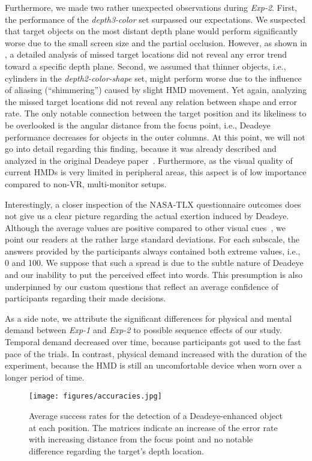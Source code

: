 \documentclass[journal]{vgtc}                %
\begin{document}
Furthermore, we made two rather unexpected observations during \textit{Exp-2}. First, the performance of the \textit{depth3-color} set surpassed our expectations. We suspected that target objects on the most distant depth plane would perform significantly worse due to the small screen size and the partial occlusion. However, as shown in , a detailed analysis of missed target locations did not reveal any error trend toward a specific depth plane. Second, we assumed that thinner objects, i.e., cylinders in the \textit{depth2-color-shape} set, might perform worse due to the influence of aliasing (``shimmering'') caused by slight HMD movement. Yet again, analyzing the missed target locations did not reveal any relation between shape and error rate. The only notable connection between the target position and its likeliness to be overlooked is the angular distance from the focus point, i.e., Deadeye performance decreases for objects in the outer columns. At this point, we will not go into detail regarding this finding, because it was already described and analyzed in the original Deadeye paper~\cite{krekhov2019deadeye}. Furthermore, as the visual quality of current HMDs is very limited in peripheral areas, this aspect is of low importance compared to non-VR, multi-monitor setups. 

Interestingly, a closer inspection of the NASA-TLX questionnaire outcomes does not give us a clear picture regarding the actual exertion induced by Deadeye. Although the average values are positive compared to other visual cues~\cite{Gutwin:2017:PPI:3025453.3025984}, we point our readers at the rather large standard deviations. For each subscale, the answers provided by the participants always contained both extreme values, i.e., 0 and 100. We suppose that such a spread is due to the subtle nature of Deadeye and our inability to put the perceived effect into words. This presumption is also underpinned by our custom questions that reflect an average confidence of participants regarding their made decisions.

As a side note, we attribute the significant differences for physical and mental demand between \textit{Exp-1} and \textit{Exp-2} to possible sequence effects of our study. Temporal demand decreased over time, because participants got used to the fast pace of the trials. In contrast, physical demand increased with the duration of the experiment, because the HMD is still an uncomfortable device when worn over a longer period of time.


\begin{figure}[t!]
\centering
\texttt{[image: figures/accuracies.jpg]}
\caption{Average success rates for the detection of a Deadeye-enhanced
object at each position. The matrices indicate an increase of the error rate with increasing distance from the focus point and no notable difference regarding the target's depth location.}
\label{fig:accuracies}
\end{figure}
\end{document}

